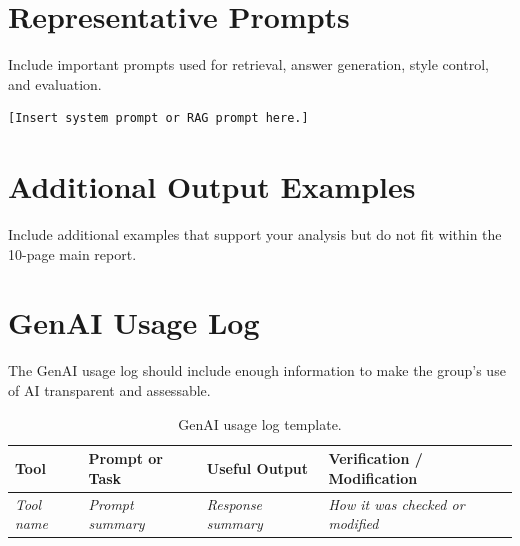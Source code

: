 \documentclass[10pt,conference]{IEEEtran}
\begin{document}
\section{Representative Prompts}
\label{app:prompts}

Include important prompts used for retrieval, answer generation, style control, and evaluation.

\begin{lstlisting}
[Insert system prompt or RAG prompt here.]
\end{lstlisting}

\section{Additional Output Examples}
\label{app:outputs}

Include additional examples that support your analysis but do not fit within the 10-page main report.

\section{GenAI Usage Log}
\label{app:genai-log}

The GenAI usage log should include enough information to make the group's use of AI transparent and assessable.

\begin{table}[h]
\centering
\caption{GenAI usage log template.}
\label{tab:genai-log}
\begin{tabularx}{\textwidth}{p{2.2cm} p{3.0cm} p{3.0cm} X}
\toprule
Tool & Prompt or Task & Useful Output & Verification / Modification \\
\midrule
\emph{Tool name} & \emph{Prompt summary} & \emph{Response summary} & \emph{How it was checked or modified} \\
\bottomrule
\end{tabularx}
\end{table}
\end{document}
